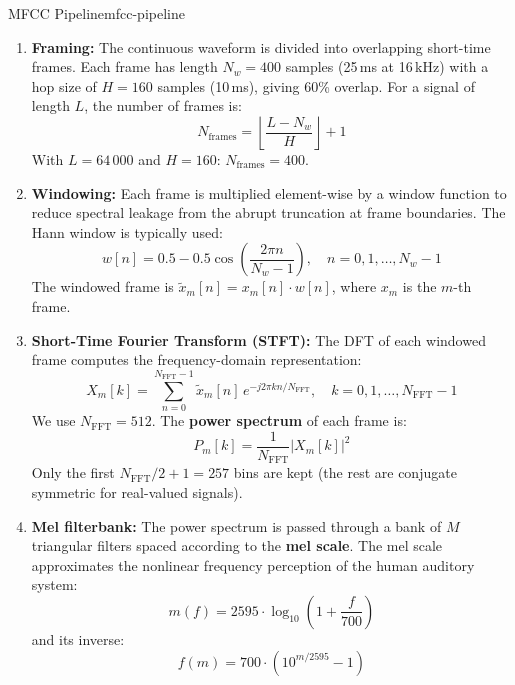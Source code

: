 \documentclass[12pt]{report}
\begin{document}
\begin{tecbox}{MFCC Pipeline}{mfcc-pipeline}
\begin{enumerate}
    \item \textbf{Framing:} The continuous waveform is divided into overlapping short-time
          frames. Each frame has length $N_w = 400$ samples (25\,ms at 16\,kHz) with a hop
          size of $H = 160$ samples (10\,ms), giving 60\% overlap.
          For a signal of length $L$, the number of frames is:
          \begin{equation}
              N_\text{frames} = \left\lfloor \frac{L - N_w}{H} \right\rfloor + 1
          \end{equation}
          With $L = 64\,000$ and $H = 160$: $N_\text{frames} = 400$.

    \item \textbf{Windowing:} Each frame is multiplied element-wise by a window function to
          reduce spectral leakage from the abrupt truncation at frame boundaries. The Hann
          window is typically used:
          \begin{equation}
              w[n] = 0.5 - 0.5 \cos\!\left(\frac{2\pi n}{N_w - 1}\right),
              \quad n = 0, 1, \ldots, N_w - 1
          \end{equation}
          The windowed frame is $\tilde{x}_m[n] = x_m[n] \cdot w[n]$, where $x_m$ is the
          $m$-th frame.

    \item \textbf{Short-Time Fourier Transform (STFT):} The DFT of each windowed frame
          computes the frequency-domain representation:
          \begin{equation}
              X_m[k] = \sum_{n=0}^{N_\text{FFT}-1} \tilde{x}_m[n] \, e^{-j 2\pi k n / N_\text{FFT}},
              \quad k = 0, 1, \ldots, N_\text{FFT}-1
          \end{equation}
          We use $N_\text{FFT} = 512$. The \textbf{power spectrum} of each frame is:
          \begin{equation}
              P_m[k] = \frac{1}{N_\text{FFT}} |X_m[k]|^2
          \end{equation}
          Only the first $N_\text{FFT}/2 + 1 = 257$ bins are kept (the rest are conjugate
          symmetric for real-valued signals).

    \item \textbf{Mel filterbank:} The power spectrum is passed through a bank of $M$
          triangular filters spaced according to the \textbf{mel scale}. The mel scale
          approximates the nonlinear frequency perception of the human auditory system:
          \begin{equation}
              m(f) = 2595 \cdot \log_{10}\!\left(1 + \frac{f}{700}\right)
              \label{eq:mel}
          \end{equation}
          and its inverse:
          \begin{equation}
              f(m) = 700 \cdot \left(10^{m/2595} - 1\right)
              \label{eq:mel-inv}
          \end{equation}


\end{enumerate}
\end{tecbox}
\end{document}
